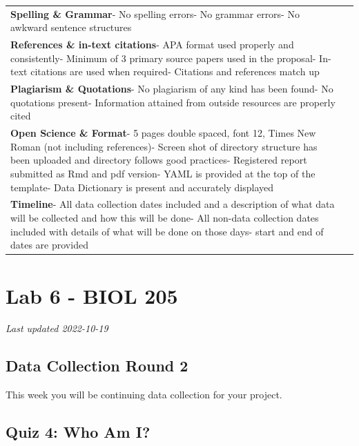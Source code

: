 \documentclass[
]{book}
\begin{document}
\begin{longtable}[]{@{}
  >{\raggedright\arraybackslash}p{}
  >{\raggedright\arraybackslash}p{}@{}}
\textbf{Spelling \& Grammar}- No spelling errors- No grammar errors- No awkward sentence structures & 3 \\
\textbf{References \& in-text citations}- APA format used properly and consistently- Minimum of 3 primary source papers used in the proposal- In-text citations are used when required- Citations and references match up & 4 \\
\textbf{Plagiarism \& Quotations}- No plagiarism of any kind has been found- No quotations present- Information attained from outside resources are properly cited & 3 \\
\textbf{Open Science \& Format}- 5 pages double spaced, font 12, Times New Roman (not including references)- Screen shot of directory structure has been uploaded and directory follows good practices- Registered report submitted as Rmd and pdf version- YAML is provided at the top of the template- Data Dictionary is present and accurately displayed & 4 \\
\textbf{Timeline}- All data collection dates included and a description of what data will be collected and how this will be done- All non-data collection dates included with details of what will be done on those days- start and end of dates are provided & 3 \\
\bottomrule()
\end{longtable}

\hypertarget{part-lab-6---biol-205}{%
\part*{Lab 6 - BIOL 205}\label{part-lab-6---biol-205}}

\emph{Last updated 2022-10-19}

\hypertarget{data-collection-round-2}{%
\chapter*{Data Collection Round 2}\label{data-collection-round-2}}

This week you will be continuing data collection for your project.

\hypertarget{quiz-4-who-am-i}{%
\chapter*{Quiz 4: Who Am I?}\label{quiz-4-who-am-i}}
\end{document}
